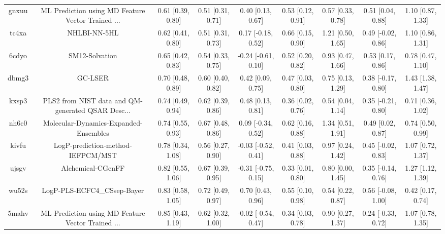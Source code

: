\documentclass{article}
\begin{document}
\begin{center}
\begin{longtable}{|ccccccccc|}
 gnxuu &  ML Prediction using MD Feature Vector Trained ... &  0.61 [0.39, 0.80] &  0.51 [0.31, 0.71] &     0.40 [0.13, 0.67] &  0.53 [0.12, 0.91] &    0.57 [0.33, 0.78] &    0.51 [0.04, 0.88] &     1.10 [0.87, 1.33] \\
 tc4xa &                                       NHLBI-NN-5HL &  0.62 [0.41, 0.80] &  0.51 [0.31, 0.73] &    0.17 [-0.18, 0.52] &  0.66 [0.15, 0.90] &    1.21 [0.50, 1.65] &   0.49 [-0.02, 0.86] &     1.10 [0.86, 1.31] \\
 6cdyo &                                     SM12-Solvation &  0.65 [0.42, 0.83] &  0.54 [0.33, 0.75] &   -0.24 [-0.61, 0.10] &  0.52 [0.20, 0.82] &    0.93 [0.47, 1.66] &    0.53 [0.17, 0.86] &     0.78 [0.47, 1.10] \\
 dbmg3 &                                            GC-LSER &  0.70 [0.48, 0.89] &  0.60 [0.40, 0.82] &     0.42 [0.09, 0.75] &  0.47 [0.03, 0.80] &    0.75 [0.13, 1.29] &   0.38 [-0.17, 0.80] &     1.43 [1.38, 1.47] \\
 kxsp3 &  PLS2 from NIST data and QM-generated QSAR Desc... &  0.74 [0.49, 0.94] &  0.62 [0.39, 0.86] &     0.48 [0.13, 0.81] &  0.36 [0.02, 0.76] &    0.54 [0.04, 1.14] &   0.35 [-0.21, 0.80] &     0.71 [0.36, 1.02] \\
 nh6c0 &              Molecular-Dynamics-Expanded-Ensembles &  0.74 [0.55, 0.93] &  0.67 [0.48, 0.86] &    0.09 [-0.34, 0.52] &  0.62 [0.16, 0.88] &    1.34 [0.51, 1.91] &    0.49 [0.02, 0.87] &     0.74 [0.50, 0.99] \\
 kivfu &                  LogP-prediction-method-IEFPCM/MST &  0.78 [0.34, 1.08] &  0.56 [0.27, 0.90] &   -0.03 [-0.52, 0.41] &  0.41 [0.03, 0.88] &    0.97 [0.24, 1.42] &   0.45 [-0.02, 0.83] &     1.07 [0.72, 1.37] \\
 ujsgv &                                  Alchemical-CGenFF &  0.82 [0.55, 1.06] &  0.67 [0.39, 0.95] &   -0.31 [-0.75, 0.15] &  0.33 [0.01, 0.80] &    0.80 [0.00, 1.45] &   0.35 [-0.14, 0.76] &     1.27 [1.12, 1.39] \\
 wu52s &                        LogP-PLS-ECFC4\_CSsep-Bayer &  0.83 [0.58, 1.05] &  0.72 [0.49, 0.97] &     0.70 [0.43, 0.96] &  0.55 [0.10, 0.98] &    0.54 [0.22, 0.87] &   0.56 [-0.08, 1.00] &     0.42 [0.17, 0.74] \\
 5mahv &  ML Prediction using MD Feature Vector Trained ... &  0.85 [0.43, 1.19] &  0.62 [0.32, 1.00] &   -0.02 [-0.54, 0.47] &  0.34 [0.03, 0.78] &    0.90 [0.27, 1.37] &   0.24 [-0.33, 0.72] &     1.07 [0.78, 1.35] \\

\end{longtable}
\end{center}
\end{document}
